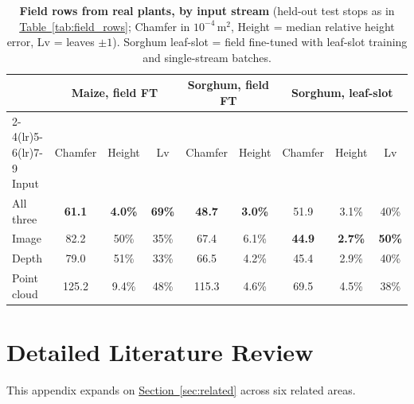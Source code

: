 \documentclass[10pt,twocolumn,letterpaper]{article}
\newcommand{\updtwo}[1]{#1}
\newcommand{\tabref}[1]{\hyperref[#1]{Table~\ref*{#1}}}
\newcommand{\Secref}[1]{\hyperref[#1]{Section~\ref*{#1}}}
\begin{document}
\begin{table}[t]
  \caption{\updtwo{\textbf{Field rows from real plants, by input stream} (held-out test stops as in \tabref{tab:field_rows}; Chamfer in $10^{-4}$\,m$^2$, Height = median relative height error, Lv = leaves $\pm1$). Sorghum leaf-slot = field fine-tuned with leaf-slot training and single-stream batches.}}
  \label{tab:field_rows_single}
  \centering\scriptsize
  \setlength{\tabcolsep}{2.2pt}
  {%
  \begin{tabular}{l ccc cc ccc}
    \toprule
    & \multicolumn{3}{c}{Maize, field FT} & \multicolumn{2}{c}{Sorghum, field FT} & \multicolumn{3}{c}{Sorghum, leaf-slot} \\
    \cmidrule(lr){2-4}\cmidrule(lr){5-6}\cmidrule(lr){7-9}
    Input & Chamfer & Height & Lv & Chamfer & Height & Chamfer & Height & Lv \\
    \midrule
    All three & \textbf{61.1} & \textbf{4.0\%} & \textbf{69\%} & \textbf{48.7} & \textbf{3.0\%} & 51.9 & 3.1\% & 40\% \\
    Image & 82.2 & 50\% & 35\% & 67.4 & 6.1\% & \textbf{44.9} & \textbf{2.7\%} & \textbf{50\%} \\
    Depth & 79.0 & 51\% & 33\% & 66.5 & 4.2\% & 45.4 & 2.9\% & 40\% \\
    Point cloud & 125.2 & 9.4\% & 48\% & 115.3 & 4.6\% & 69.5 & 4.5\% & 38\% \\
    \bottomrule
  \end{tabular}}
\end{table}





\section{Detailed Literature Review}
\label{app:litreview}

This appendix expands on \Secref{sec:related} across six related areas.
\end{document}
